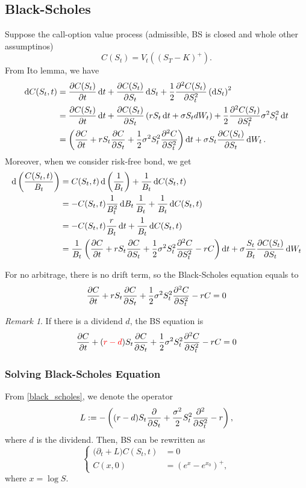 \documentclass[10pt]{article}
\theoremstyle{remark}
\newtheorem{Remark}{Remark}[section]
\theoremstyle{plain}
\newcommand{\p}{\partial}
\numberwithin{equation}{section}
\begin{document}
\subsection{Black-Scholes}
Suppose the call-option value process (admissible, BS is closed and whole other assumptinos)
\[
	C(S_t) = V_t((S_T-K)^+).
\]
From Ito lemma, we have
\begin{align*}
	\dd{C(S_t, t)} & = \pdv{C(S_t)}{t}\dd{t} +  \pdv{C(S_t)}{S_t}\dd{S_t} + \frac{1}{2} \pdv[2]{C(S_t)}{S_t}  \left(\dd{S_t}\right)^2
	\\
	& = \pdv{C(S_t)}{t}\dd{t}  +  \pdv{C(S_t)}{S_t}\left(r S_t \dd{t} + \sigma S_t dW_t \right) + \frac{1}{2} \pdv[2]{C(S_t)}{S_t}  \sigma^2 S_t^2  \dd{t}
	\\
	&
	= \left(\pdv{C}{t}  + r S_t \pdv{C}{S_t} + \frac{1}{2}  \sigma^2 S_t^2 \pdv[2]{C}{S_t}\right) \dd{t}   + \sigma S_t \pdv{C(S_t)}{S_t} \dd{W_t} .
\end{align*}
Moreover, when we consider risk-free bond, we get
\begin{align*}
	\dd{\left(\frac{C(S_t,t)}{B_t}\right)} & = C(S_t,t) \dd{\left(\frac{1}{B_t}\right)} + \frac{1}{B_t} \dd{C(S_t,t)}
	\\
	& =  -  C(S_t,t) \frac{1}{B^2_t} \dd{B_t} \frac{1}{B_t}  + \frac{1}{B_t} \dd{C(S_t,t)} 
	\\
	& = -  C(S_t,t) \frac{r}{B_t} \dd{t} + \frac{1}{B_t} \dd{C(S_t,t)} 
	\\
	& = \frac{1}{B_t} \left(\pdv{C}{t}  + r S_t \pdv{C}{S_t} + \frac{1}{2}  \sigma^2 S_t^2 \pdv[2]{C}{S_t} - rC\right) \dd{t} + \sigma \frac{S_t}{B_t}\pdv{C(S_t)}{S_t}  \dd{W_t}  
\end{align*}


For no arbitrage, there is no drift term, so the Black-Scholes equation equals to
\begin{equation}\label{black_scholes}
	\pdv{C}{t}  + r S_t \pdv{C}{S_t} + \frac{1}{2}  \sigma^2 S_t^2 \pdv[2]{C}{S_t} -rC = 0
\end{equation}

\begin{Remark}
	If there is a dividend $d$, the BS equation is 
	\[
		\pdv{C}{t}  + ({\color{red}r-d})S_t \pdv{C}{S_t} + \frac{1}{2}  \sigma^2 S_t^2 \pdv[2]{C}{S_t} -rC = 0
	\]
\end{Remark}

\subsubsection{Solving Black-Scholes Equation}
From \eqref{black_scholes}, we denote the operator
	\[
		L := - \left( (r-d) S_t \pdv{S_t} + \frac{\sigma^2}{2} S^2_t \pdv[2]{S_t} - r\right),
	\]
where $d$ is the dividend. 
Then, BS can be rewritten as
\begin{equation}
	\begin{cases}
		\big(\p_t + L\big) C(S_t, t) &= 0 \\
		C(x, 0) & = (e^x - e^{x_0})^+,
	\end{cases}
\end{equation}
where $x = \log S$.
\end{document}
